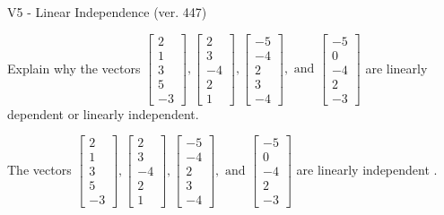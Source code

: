 \begin{exercise}
  \begin{exerciseTitle}V5 - Linear Independence (ver. 447)\end{exerciseTitle}
  \begin{exerciseStatement}
    Explain why the vectors \(\left[\begin{array}{r}
2 \\
1 \\
3 \\
5 \\
-3
\end{array}\right] , \left[\begin{array}{r}
2 \\
3 \\
-4 \\
2 \\
1
\end{array}\right] , \left[\begin{array}{r}
-5 \\
-4 \\
2 \\
3 \\
-4
\end{array}\right] , \text{ and } \left[\begin{array}{r}
-5 \\
0 \\
-4 \\
2 \\
-3
\end{array}\right]\) are linearly dependent or linearly independent.	


  \end{exerciseStatement}
  \begin{exerciseAnswer}
   The vectors \(\left[\begin{array}{r}
2 \\
1 \\
3 \\
5 \\
-3
\end{array}\right] , \left[\begin{array}{r}
2 \\
3 \\
-4 \\
2 \\
1
\end{array}\right] , \left[\begin{array}{r}
-5 \\
-4 \\
2 \\
3 \\
-4
\end{array}\right] , \text{ and } \left[\begin{array}{r}
-5 \\
0 \\
-4 \\
2 \\
-3
\end{array}\right]\) are 
  	 linearly independent  .
  


  \end{exerciseAnswer}
\end{exercise}
